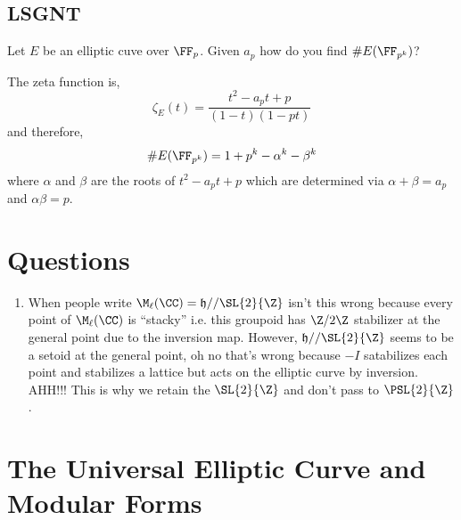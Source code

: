 \documentclass[12pt]{article}
\begin{document}
\subsection{LSGNT}

\begin{exercise}
Let $E$ be an elliptic cuve over $\FF_p$. Given $a_p$ how do you find $\# E(\FF_{p^k})$?
\end{exercise}
\noindent
The zeta function is,
\[ \zeta_E(t) = \frac{t^2 - a_p t + p}{(1 - t)(1 - p t)} \]
and therefore,
\[ \# E(\FF_{p^k}) = 1 + p^k - \alpha^k - \beta^k \]
where $\alpha$ and $\beta$ are the roots of $t^2 - a_p t + p$ which are determined via $\alpha + \beta = a_p$ and $\alpha \beta = p$.

\section{Questions}

\newcommand{\h}{\mathfrak{h}}

\begin{enumerate}
\item When people write $\M_{\ell}(\CC) = \h // \SL{2}{\Z}$ isn't this wrong because every point of $\M_{\ell}(\CC)$ is ``stacky'' i.e. this groupoid has $\Z / 2\Z$ stabilizer at the general point due to the inversion map. However, $\h // \SL{2}{\Z}$ seems to be a setoid at the general point, oh no that's wrong because $-I$ satabilizes each point and stabilizes a lattice but acts on the elliptic curve by inversion. AHH!!! This is why we retain the $\SL{2}{\Z}$ and don't pass to $\PSL{2}{\Z}$.
\end{enumerate}

\section{The Universal Elliptic Curve and Modular Forms}
\end{document}
